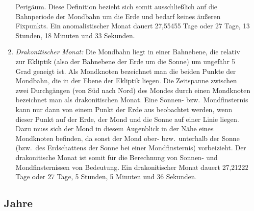 \begin{enumerate}
Perig\"aum. Diese Definition bezieht sich somit ausschlie\ss lich auf die Bahnperiode der
Mondbahn um die Erde und bedarf keines \"au\ss eren Fixpunkts. 
Ein anomalistischer Monat dauert 27,55455 Tage oder 27 Tage, 13 Stunden, 18
Minuten und 33 Sekunden. 
\item
\textit{Drakonitischer Monat:}
Die Mondbahn liegt in einer Bahnebene, die relativ zur Ekliptik (also der Bahnebene der
Erde um die Sonne) um ungef\"ahr 5 Grad geneigt ist. Als Mondknoten bezeichnet man
die beiden Punkte der Mondbahn, die in der Ebene der Ekliptik liegen. Die Zeitspanne
zwischen zwei Durchg\"angen (von S\"ud nach Nord) des Mondes durch einen Mondknoten
bezeichnet man als drakonitischen Monat. Eine Sonnen- bzw.\ Mondfinsternis kann nur
dann von einem Punkt der Erde aus beobachtet werden, wenn dieser Punkt auf der Erde, der 
Mond und die
Sonne auf einer Linie liegen. Dazu muss sich der Mond in diesem Augenblick in der
N\"ahe eines Mondknoten befinden, da sonst der Mond ober- bzw.\ unterhalb der Sonne
(bzw.\ des Erdschattens der Sonne bei einer Mondfinsternis) vorbeizieht. Der 
drakonitische Monat ist somit f\"ur die Berechnung von Sonnen- und Mondfinsternissen von
Bedeutung. Ein drakonitischer Monat dauert 27,21222 Tage oder 27 Tage, 5 Stunden, 5
Minuten und 36 Sekunden. 
\end{enumerate}

\subsection{Jahre}

